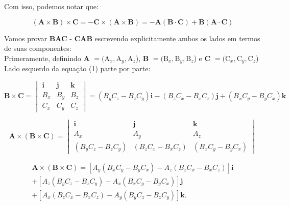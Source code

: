 \documentclass[a4paper,12pt]{article}
\begin{document}
Com isso, podemos notar que:

\begin{equation}
    (\textbf{A}\times\textbf{B})\times\textbf{C} = -\textbf{C}\times(\textbf{A}\times\textbf{B}) = -\textbf{A}(\textbf{B}\cdot\textbf{C}) + \textbf{B}(\textbf{A}\cdot\textbf{C})
\end{equation}

Vamos provar \textbf{BAC} - \textbf{CAB} escrevendo explicitamente ambos os lados em termos de suas componentes:\\

Primeramente, definindo \textbf{A} $= (\textrm{A}_{x}, \textrm{A}_{y}, \textrm{A}_{z}$), \textbf{B} $= (\textrm{B}_{x}, \textrm{B}_{y}, \textrm{B}_{z}$) 
e \textbf{C} $= (\textrm{C}_{x}, \textrm{C}_{y}, \textrm{C}_{z}$)\\

Lado esquerdo da equa\c{c}\~ao (1) parte por parte:

\begin{equation}
    \mathbf{B} \times \mathbf{C} =
\begin{vmatrix}
\mathbf{i} & \mathbf{j} & \mathbf{k} \\
B_x & B_y & B_z \\
C_x & C_y & C_z
\end{vmatrix} =
(B_yC_z - B_zC_y)\mathbf{i} -
(B_zC_x - B_xC_z)\mathbf{j} +
(B_xC_y - B_yC_x)\mathbf{k}
\end{equation}


\begin{equation}
\mathbf{A} \times (\mathbf{B} \times \mathbf{C}) =
\begin{vmatrix}
\mathbf{i} & \mathbf{j} & \mathbf{k} \\
A_x & A_y & A_z \\
(B_yC_z - B_zC_y) & (B_zC_x - B_xC_z) & (B_xC_y - B_yC_x)
\end{vmatrix}
\end{equation}

\begin{equation}
    \begin{aligned}
    \mathbf{A} \times (\mathbf{B} \times \mathbf{C}) = \left[ A_y(B_xC_y - B_yC_x) - A_z(B_zC_x - B_xC_z) \right] \mathbf{i} \\ +
    \left[A_z(B_yC_z - B_zC_y) - A_x(B_xC_y - B_yC_x) \right] \mathbf{j}\\ +
    \left[ A_x(B_zC_x - B_xC_z) - A_y(B_yC_z - B_zC_y) \right] \mathbf{k}.
\end{aligned}
\end{equation}\\
\end{document}
